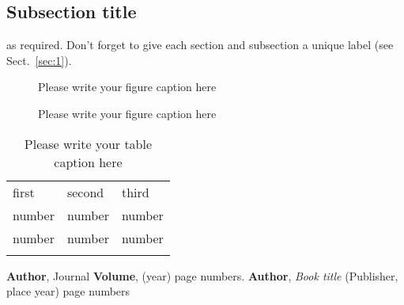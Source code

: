 \subsection{Subsection title}
\label{sec:2}
as required. Don't forget to give each section
and subsection a unique label (see Sect.~\ref{sec:1}).
%
\begin{figure}
\caption{Please write your figure caption here}
\label{fig:1}       %
\end{figure}
%
\begin{figure*}
\vspace*{5cm}       %
\caption{Please write your figure caption here}
\label{fig:2}       %
\end{figure*}
%
\begin{table}
\caption{Please write your table caption here}
\label{tab:1}       %
\begin{tabular}{lll}
\hline\noalign{\smallskip}
first & second & third  \\
\noalign{\smallskip}\hline\noalign{\smallskip}
number & number & number \\
number & number & number \\
\noalign{\smallskip}\hline
\end{tabular}
\vspace*{5cm}  %
\end{table}
%
% 
% 
%
\begin{thebibliography}{}
%
%
\textbf{Author}, Journal \textbf{Volume}, (year) page numbers.
\textbf{Author}, \textit{Book title} (Publisher, place year) page numbers
\end{thebibliography}





